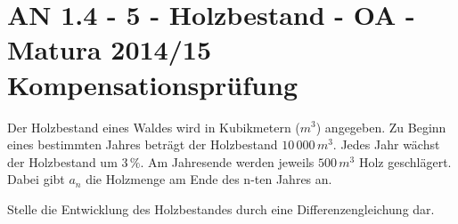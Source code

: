\section{AN 1.4 - 5 - Holzbestand - OA - Matura 2014/15 Kompensationsprüfung}

\begin{beispiel}[AN 1.4]{1} %
				Der Holzbestand eines Waldes wird in Kubikmetern ($m^3$) angegeben. Zu Beginn eines bestimmten Jahres beträgt der Holzbestand $10\,000\,m^3$. Jedes Jahr wächst der Holzbestand um $3\,\%$. Am Jahresende werden jeweils $500\,m^3$ Holz geschlägert. Dabei gibt $a_{n}$ die Holzmenge am Ende des n-ten Jahres an.
				
				Stelle die Entwicklung des Holzbestandes durch eine Differenzengleichung dar.
				
\end{beispiel}